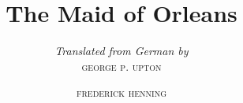 \titlehead{}
\subject{}
\title{\Huge  The Maid of Orleans }
\subtitle{\normalsize \textit{Translated from German by}\\\textsc{george p. upton}}
\author{\scshape frederick henning}
\date{}
\publishers{\large 1904}
